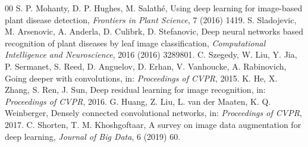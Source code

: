 \documentclass[a4paper,fleqn]{cas-dc}
\begin{document}

\begin{thebibliography}{00}
 S. P. Mohanty, D. P. Hughes, M. Salath\'e, Using deep learning for image-based plant disease detection, \textit{Frontiers in Plant Science}, 7 (2016) 1419.
 S. Sladojevic, M. Arsenovic, A. Anderla, D. Culibrk, D. Stefanovic, Deep neural networks based recognition of plant diseases by leaf image classification, \textit{Computational Intelligence and Neuroscience}, 2016 (2016) 3289801.
 C. Szegedy, W. Liu, Y. Jia, P. Sermanet, S. Reed, D. Anguelov, D. Erhan, V. Vanhoucke, A. Rabinovich, Going deeper with convolutions, in: \textit{Proceedings of CVPR}, 2015.
 K. He, X. Zhang, S. Ren, J. Sun, Deep residual learning for image recognition, in: \textit{Proceedings of CVPR}, 2016.
 G. Huang, Z. Liu, L. van der Maaten, K. Q. Weinberger, Densely connected convolutional networks, in: \textit{Proceedings of CVPR}, 2017.
 C. Shorten, T. M. Khoshgoftaar, A survey on image data augmentation for deep learning, \textit{Journal of Big Data}, 6 (2019) 60.
\end{thebibliography}
\end{document}
